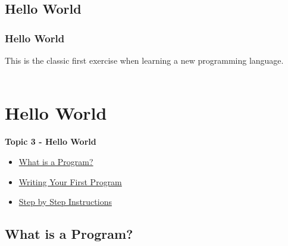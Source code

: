\documentclass[fleqn]{beamer} %
\newcommand{\sectionIIItitle}{Hello World}
\newcommand{\sectionIIsubsectionIVtitle}{Hello World}
\newcommand{\sectionIIIsubsectionItitle}{What is a Program?}
\newcommand{\sectionIIIsubsectionIItitle}{Writing Your First Program}
\newcommand{\sectionIIIsubsectionIIItitle}{Step by Step Instructions}
\newcommand{\sectionIIIsubsectionIVtitle}{-}
\begin{document}
		\subsection{\sectionIIsubsectionIVtitle}\label{sectionIIsubsectionIV}

			\begin{frame}
				\frametitle{\sectionIIsubsectionIVtitle}
				\bigskip

				This is the classic first exercise when learning a new programming language. \vspace{10mm}\\

				 \vspace{3mm}\\

				\btVFill 
			\end{frame}
		
	\section{\sectionIIItitle}\label{sectionIII}

		\begin{frame}
			\large \textbf{Topic 3 - \sectionIIItitle} \vspace{3mm}\\

			\begin{itemize}
				\item \hyperlink{sectionIIIsubsectionI}{\sectionIIIsubsectionItitle} \vspc %
				\item \hyperlink{sectionIIIsubsectionII}{\sectionIIIsubsectionIItitle} \vspc %
				\item \hyperlink{sectionIIIsubsectionIII}{\sectionIIIsubsectionIIItitle} \vspc %
			\end{itemize}

		\end{frame}

		\subsection{\sectionIIIsubsectionItitle}\label{sectionIIIsubsectionI}
\end{document}
